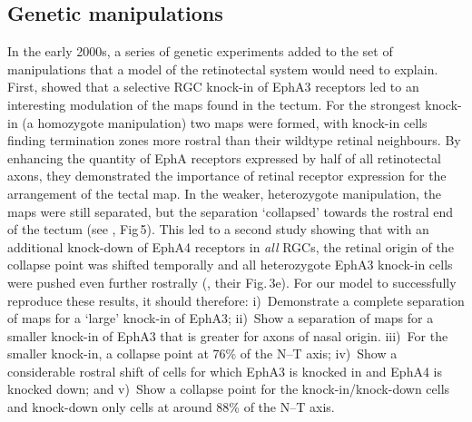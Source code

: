 \documentclass[11pt, a4paper]{article}
\begin{document}
\subsection*{Genetic manipulations}

In the early 2000s, a series of genetic experiments added to the set of manipulations that a model of the retinotectal system would need to
explain. 
First, \citet{brown_topographic_2000} showed that a selective RGC knock-in of EphA3 receptors led to an interesting modulation of the maps found in the tectum. 
For the strongest knock-in (a homozygote manipulation) two maps were formed, with knock-in cells finding termination zones more rostral than their wildtype retinal neighbours. 
By enhancing the quantity of EphA receptors expressed by half of all retinotectal axons, they demonstrated the importance of retinal receptor expression for the arrangement of the tectal map. 
In the weaker, heterozygote manipulation, the maps were still separated, but the separation `collapsed' towards the rostral end of the tectum (see \citet{brown_topographic_2000}, Fig\,5). 
This led to a second study showing that with an additional knock-down of EphA4 receptors in \emph{all} RGCs, the retinal origin of the collapse point was shifted temporally and all heterozygote EphA3 knock-in cells were pushed even further rostrally (\citet{reber_relative_2004}, their Fig.\,3e). 
For our model to successfully reproduce these results, it should therefore: i)~Demonstrate a complete separation of maps for a `large' knock-in of EphA3; ii)~Show a separation of maps for a smaller knock-in of EphA3 that is greater for axons of nasal origin. iii)~For the smaller knock-in, a collapse point at 76\% of the N--T axis; iv)~Show a considerable rostral shift of cells for which EphA3 is knocked in and EphA4 is knocked down; and v)~Show a collapse point for the knock-in/knock-down cells and knock-down only cells at around 88\% of the N--T axis.
\end{document}
